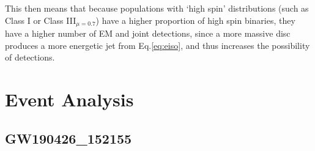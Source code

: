     This then means that because populations with `high spin' distributions (such as
    Class I or Class III$_{\mu = 0.7}$) have a higher proportion of high spin binaries,
    they have a higher number of EM and joint detections, since a more massive disc
    produces a more energetic jet from Eq.\ref{eq:eiso}, and thus increases the
    possibility of detections.

\section{Event Analysis}\label{sec:event_analysis}

    \subsection{GW190426\_152155}\label{ssec:nsbh_190426}

